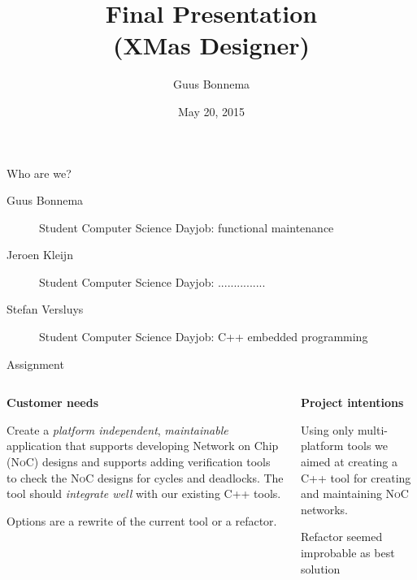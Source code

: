 \documentclass[11pt]{beamer}
\author{Guus Bonnema}
\title{Final Presentation\\(XMas Designer)}
\institute{Open University\\team033\\Guus Bonnema, Stefan Versluys, Jeroen Kleijn}
\date{May 20, 2015}
\begin{document}
\newcommand{\Noc}{\textsc{NoC}\xspace}
\newcommand{\qt}{\textsc{Qt}\xspace}
\newcommand{\qml}{\textsc{Qml}\xspace}

\begin{frame}
	\titlepage
\end{frame}

\begin{frame}{Who are we?}
	\begin{description}
		\item[Guus Bonnema]	Student Computer Science
							Dayjob: functional maintenance
		\item[Jeroen Kleijn] Student Computer Science
							 Dayjob: ...............
		\item[Stefan Versluys]	Student Computer Science
								Dayjob: C++ embedded programming
	\end{description}
\end{frame}

\begin{frame}{Assignment}
	\begin{columns}
		\begin{column}[t]{5cm}
		{\bf Customer needs}

		Create a {\it platform independent}, {\it maintainable} application that supports
		developing Network on Chip (\Noc) designs and supports adding verification tools
		to check the \Noc designs for cycles and deadlocks. The tool should {\it integrate well}
		with our existing C++ tools.
		
		Options are a rewrite
		of the current tool or a refactor.
		\end{column}
		\begin{column}[t]{5cm}
		{\bf Project intentions}		
		
		Using only multi-platform tools we aimed at creating a C++ tool for creating
		and maintaining \Noc networks.
		
		Refactor seemed improbable as best solution
		\end{column}
	\end{columns}
\end{frame}
\end{document}
